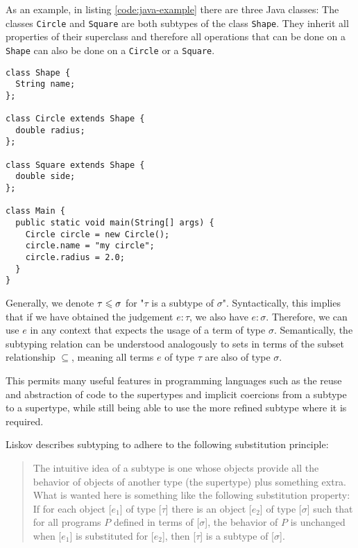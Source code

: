 As an example, in listing \ref{code:java-example} there are three Java classes:
The classes \texttt{Circle} and \texttt{Square} are both subtypes of the class \texttt{Shape}.
They inherit all properties of their superclass and therefore all operations that can be done on a \texttt{Shape} can also be done on a \texttt{Circle} or a \texttt{Square}.

\begin{code}
\label{code:java-example}
\begin{verbatim}
class Shape {
  String name;
};

class Circle extends Shape {
  double radius;
};

class Square extends Shape {
  double side;
};

class Main {
  public static void main(String[] args) {
    Circle circle = new Circle();
    circle.name = "my circle";
    circle.radius = 2.0;
  }
}
\end{verbatim}
\end{code}

Generally, we denote $\tau \leqslant \sigma$ for "$\tau$ is a subtype of $\sigma$".
Syntactically, this implies that if we have obtained the judgement $e : \tau$, we also have $e : \sigma$.
Therefore, we can use $e$ in any context that expects the usage of a term of type $\sigma$.
Semantically, the subtyping relation can be understood analogously to sets in terms of the subset relationship $\subseteq$,
meaning all terms $e$ of type $\tau$ are also of type $\sigma$.
\cite{reynolds_1998}

This permits many useful features in programming languages such as the reuse and abstraction of code to the supertypes and implicit coercions from a subtype to a supertype, while still being able to use the more refined subtype where it is required.

Liskov \cite{liskov} describes subtyping to adhere to the following substitution principle:

\begin{quote}
  The intuitive idea of a subtype is one whose objects provide all the behavior of objects of another type (the supertype) plus something extra.
  What is wanted here is something like the following substitution property:
  If for each object [$e_1$] of type [$\tau$] there is an object [$e_2$] of type [$\sigma$] such that for all programs $P$ defined in terms of [$\sigma$],
  the behavior of $P$ is unchanged when [$e_1$] is substituted for [$e_2$], then [$\tau$] is a subtype of [$\sigma$].
\end{quote}


